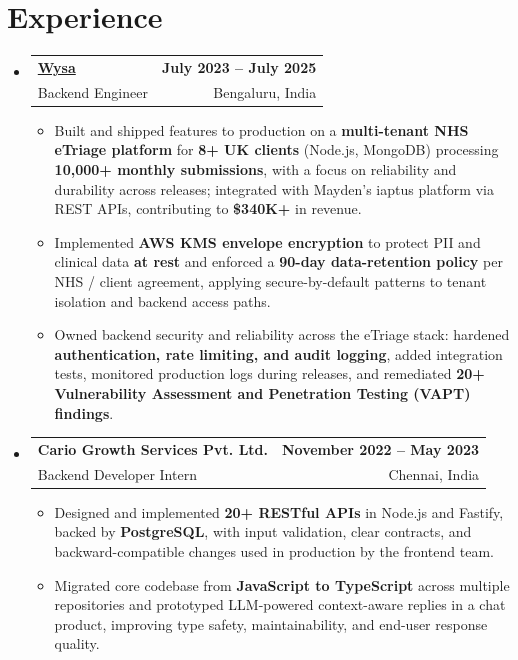 \documentclass[letterpaper,10pt]{article}
\makeatletter
\newcommand{\resumeItem}[1]{
  \item\small{#1\vspace{-1pt}}
}
\newcommand{\resumeSubheading}[4]{
  \vspace{1pt}\item
    \begin{tabular*}{0.985\textwidth}[t]{l@{\extracolsep{\fill}}r}
      \textbf{#1} & \textbf{\small #2} \\
      {\small\color{ResumeSlate} #3} & {\small\color{ResumeSlate} #4} \\
    \end{tabular*}\vspace{-6pt}
}
\newcommand{\resumeSubHeadingListStart}{\begin{itemize}[leftmargin=0.0in, label={}, itemsep=2pt, topsep=2pt]}
\newcommand{\resumeSubHeadingListEnd}{\end{itemize}}
\newcommand{\resumeItemListStart}{\begin{itemize}[leftmargin=0.18in, itemsep=2pt, topsep=1pt]}
\newcommand{\resumeItemListEnd}{\end{itemize}\vspace{-4pt}}
\makeatother
\begin{document}
\section{Experience}
\resumeSubHeadingListStart
  \resumeSubheading
    {\href{https://www.wysa.io}{Wysa}}{July 2023 -- July 2025}
    {Backend Engineer}{Bengaluru, India}
    \resumeItemListStart
      \resumeItem{Built and shipped features to production on a \textbf{multi-tenant NHS eTriage platform} for \textbf{8+ UK clients} (Node.js, MongoDB) processing \textbf{10{,}000+ monthly submissions}, with a focus on reliability and durability across releases; integrated with Mayden's iaptus platform via REST APIs, contributing to \textbf{\$340K+} in revenue.}
      \resumeItem{Implemented \textbf{AWS KMS envelope encryption} to protect PII and clinical data \textbf{at rest} and enforced a \textbf{90-day data-retention policy} per NHS / client agreement, applying secure-by-default patterns to tenant isolation and backend access paths.}
      \resumeItem{Owned backend security and reliability across the eTriage stack: hardened \textbf{authentication, rate limiting, and audit logging}, added integration tests, monitored production logs during releases, and remediated \textbf{20+ Vulnerability Assessment and Penetration Testing (VAPT) findings}.}
    \resumeItemListEnd
  \resumeSubheading
    {Cario Growth Services Pvt. Ltd.}{November 2022 -- May 2023}
    {Backend Developer Intern}{Chennai, India}
    \resumeItemListStart
      \resumeItem{Designed and implemented \textbf{20+ RESTful APIs} in Node.js and Fastify, backed by \textbf{PostgreSQL}, with input validation, clear contracts, and backward-compatible changes used in production by the frontend team.}
      \resumeItem{Migrated core codebase from \textbf{JavaScript to TypeScript} across multiple repositories and prototyped LLM-powered context-aware replies in a chat product, improving type safety, maintainability, and end-user response quality.}
    \resumeItemListEnd
\resumeSubHeadingListEnd
\vspace{-4pt}
\end{document}
